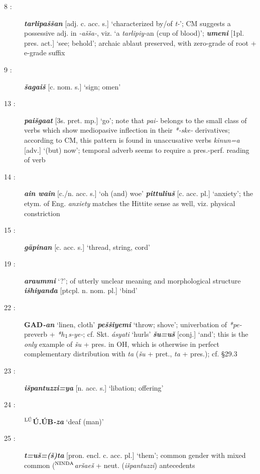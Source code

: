 \documentclass[10pt]{article}
\newcommand{\supersc}[1]{$^{\textrm{\scriptsize{#1}}}$}  	%
\newcommand{\subsc}[1]{$_{\textrm{\scriptsize{#1}}}$}	%
\newcommand{\bit}[1]{\textbf{\textit{#1}}}				%
\newcommand{\p}[1]{{\tiny[{#1}]}}					%
\newcommand{\hi}{h\subsc{1}}								%
\newcommand{\hith}{\textsubwedge{h}}
\newcommand{\Hith}{\textsubwedge{H}}
\newcommand{\man}{\supersc{L\'U}}
\newcommand{\bread}{\supersc{NINDA}}
\renewcommand{\.}[1]{\textsubdot{#1}}
\begin{document}
\begin{description}
\item[8 :] \bit{tarlipa\v{s}\v{s}an} \p{adj. c. acc. s.} `characterized by/of \textit{t-}'; CM suggests a possessive adj. in \textit{-a\v{s}\v{s}a-}, viz. `a \textit{tarlipiy-}an (cup of blood)'; \bit{umeni} \p{1pl. pres. act.} `see; behold'; archaic ablaut preserved, with zero-grade of root + e-grade suffix

\item[9 :] \bit{\v{s}agai\v{s}} \p{c. nom. s.} `sign; omen'

\item[13 :] \bit{pai\v{s}ga{\hith}at} \p{3s. pret. mp.} `go'; note that \textit{pai-} belongs to the small class of verbs which show mediopasive inflection in their \textit{*-ske-} derivatives; according to CM, this pattern is found in unaccusative verbs \textit{kinun=a} \p{adv.} `(but) now'; temporal adverb seems to require a pres.-perf. reading of verb

\item[14 :] \bit{ain wain} \p{c./n. acc. s.} `oh (and) woe' \bit{pittuliu\v{s}} \p{c. acc. pl.} `anxiety'; the etym. of Eng. \textit{anxiety} matches the Hittite sense as well, viz. physical constriction

\item[15 :] \bit{g\=apinan} \p{c. acc. s.} `thread, string, cord'

\item[19 :] \bit{araummi} `?'; of utterly unclear meaning and morphological structure  \bit{i\v{s}hiyanda} \p{ptcpl. n. nom. pl.} `bind'

\item[22 :] \textbf{GAD}\bit{-an} `linen, cloth' \bit{pe\v{s}\v{s}iyemi} `throw; shove'; univerbation of \textit{*pe-} preverb + \textit{*{\hi}s-ye-}; cf. Skt. \textit{\'asyati} `hurls' \bit{\v{s}u=u\v{s}} \p{conj.} `and'; this is the \textit{only} example of \textit{\v{s}u} + pres. in OH, which is otherwise in perfect complementary distribution with \textit{ta} (\textit{\v{s}u} + pret., \textit{ta} + pres.); cf.  \S29.3

\item[23 :] \bit{i\v{s}pantuzzi=ya} \p{n. acc. s.} `libation; offering'

\item[24 :] \textbf{{\man}\'U.{\Hith}\'UB}\bit{-za} `deaf (man)'

\item[25 :] \bit{t=u\v{s}=(\v{s})ta} \p{pron. encl. c. acc. pl.} `them'; common gender with mixed common ({\bread}\textit{{\hith}ar\v{s}ae\v{s}} + neut. (\textit{i\v{s}pantuzzi}) antecedents


\end{description}
\end{document}
